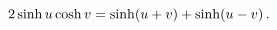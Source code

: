 \[2\mathop{\sinh\/}\nolimits u\mathop{\cosh\/}\nolimits v=\mathop{\sinh\/}%
\nolimits\!\left(u+v\right)+\mathop{\sinh\/}\nolimits\!\left(u-v\right).\]